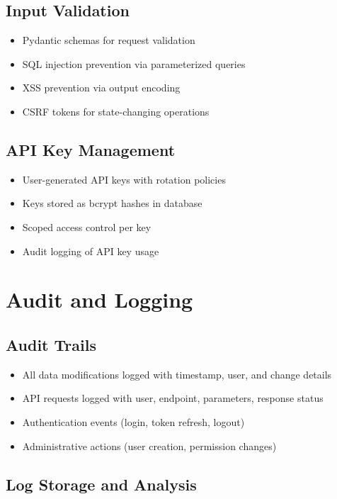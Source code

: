 \documentclass[12pt,a4paper]{report}
\begin{document}
\subsection{Input Validation}

\begin{itemize}[label=\textbullet]
    \item Pydantic schemas for request validation
    \item SQL injection prevention via parameterized queries
    \item XSS prevention via output encoding
    \item CSRF tokens for state-changing operations
\end{itemize}

\subsection{API Key Management}

\begin{itemize}[label=\textbullet]
    \item User-generated API keys with rotation policies
    \item Keys stored as bcrypt hashes in database
    \item Scoped access control per key
    \item Audit logging of API key usage
\end{itemize}

\section{Audit and Logging}

\subsection{Audit Trails}

\begin{itemize}[label=\textbullet]
    \item All data modifications logged with timestamp, user, and change details
    \item API requests logged with user, endpoint, parameters, response status
    \item Authentication events (login, token refresh, logout)
    \item Administrative actions (user creation, permission changes)
\end{itemize}

\subsection{Log Storage and Analysis}
\end{document}
